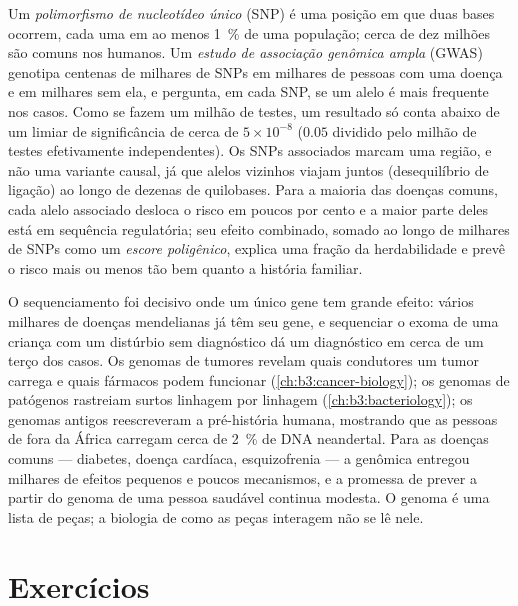\begin{definition}\label{def:b3:genomics:gwas}
Um \emph{polimorfismo de nucleotídeo único} (SNP) é uma posição em que
duas bases ocorrem, cada uma em ao menos \qty{1}{\%} de uma população;
cerca de dez milhões são comuns nos humanos. Um \emph{estudo de
associação genômica ampla} (GWAS) genotipa centenas de milhares de
SNPs em milhares de pessoas com uma doença e em milhares sem ela, e
pergunta, em cada SNP, se um alelo é mais frequente nos casos. Como se
fazem um milhão de testes, um resultado só conta abaixo de um limiar
de significância de cerca de $5\times 10^{-8}$ ($0.05$ dividido pelo
milhão de testes efetivamente independentes). Os SNPs associados
marcam uma região, e não uma variante causal, já que alelos vizinhos
viajam juntos (desequilíbrio de ligação) ao longo de dezenas de
quilobases. Para a maioria das doenças comuns, cada alelo associado
desloca o risco em poucos por cento e a maior parte deles está em
sequência regulatória; seu efeito combinado, somado ao longo de
milhares de SNPs como um \emph{escore poligênico}, explica uma fração
da herdabilidade e prevê o risco mais ou menos tão bem quanto a
história familiar.
\end{definition}

\begin{remark}\label{rem:b3:genomics:delivered}
O sequenciamento foi decisivo onde um único gene tem grande efeito:
vários milhares de doenças mendelianas já têm seu gene, e sequenciar o
exoma de uma criança com um distúrbio sem diagnóstico dá um
diagnóstico em cerca de um terço dos casos. Os genomas de tumores
revelam quais condutores um tumor carrega e quais fármacos podem
funcionar (\cref{ch:b3:cancer-biology}); os genomas de patógenos
rastreiam surtos linhagem por linhagem (\cref{ch:b3:bacteriology}); os
genomas antigos reescreveram a pré-história humana, mostrando que as
pessoas de fora da África carregam cerca de \qty{2}{\%} de DNA
neandertal. Para as doenças comuns --- diabetes, doença cardíaca,
esquizofrenia --- a genômica entregou milhares de efeitos pequenos e
poucos mecanismos, e a promessa de prever a partir do genoma de uma
pessoa saudável continua modesta. O genoma é uma lista de peças; a
biologia de como as peças interagem não se lê nele.
\end{remark}

\section{Exercícios}


